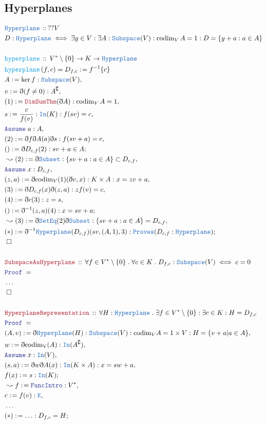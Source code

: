 \documentclass[12pt]{scrartcl}
\newcommand{\TYPE}[1]{\textcolor{NavyBlue}{\mathtt{#1}}}
\newcommand{\FUNC}[1]{\textcolor{Cerulean}{\mathtt{#1}}}
\newcommand{\LOGIC}[1]{\textcolor{Blue}{\mathtt{#1}}}
\newcommand{\THM}[1]{\textcolor{Maroon}{\mathtt{#1}}}
\renewcommand{\.}{\; . \;}
\newcommand{\de}{: \kern 0.1pc =}
\newcommand{\Act}[1]{\left( #1 \right)}
\newcommand{\Theorem}[2]{& \THM{#1} \, :: \, #2 \\ & \Proof = \\ }
\newcommand{\DeclareType}[2]{& \TYPE{#1} \, :: \, #2 \\}
\newcommand{\DefineType}[3]{& #1 : \TYPE{#2} \iff #3 \\}
\newcommand{\DeclareFunc}[2]{& \FUNC{#1} \, :: \, #2 \\}
\newcommand{\DefineNamedFunc}[4]{&  \FUNC{#1}\Act{#2} = #3 \de #4 \\}
\newcommand{\Page}[1]{\begin{align*} #1 \end{align*} \newpage   }
\newcommand{ \bd }{ \ByDef }
\newcommand{\NoProof}{ & \ldots \\ \EndProof}
\renewcommand{\c}{\complement}
\newcommand{\Say}[3]{& #1 \de #2 : #3, \\}
\newcommand{\Conclude}[3]{& #1 \de #2 : #3; \\}
\newcommand{\Derive}[3]{& \leadsto #1 \de #2 : #3, \\}
\newcommand{\A}{\LOGIC{Assume} \;}
\newcommand{\Assume}[2]{& \A #1 : #2, \\}
\newcommand{\QED}{\; \square}
\newcommand{\EndProof}{& \QED \\}
\newcommand{\ByDef}{\eth}
\newcommand{\Proof}{\LOGIC{Proof} \; }
\begin{document}
  \subsection{Hyperplanes}
  \Page{
   \DeclareType{Hyperplane}{??V}
   \DefineType{D}{Hyperplane}{\exists y \in V : \exists A : \TYPE{Subspace}(V) : 
    \mathrm{codim}_V \, A = 1 : D = \{  y + a : a \in A  \} }
   \\ 
   \DeclareFunc{hyperplane}{V^*\setminus \{ 0 \} \to K \to \TYPE{Hyperplane}  }
   \DefineNamedFunc{hyperplane}{f,c}{D_{f,c}}{ f^{-1}\{ c \} } 
   \Say{ A}{  \ker f }{ \TYPE{Subspace}(V) }
   \Say{ v  }{  \bd(f \neq 0)  }{ A^\c }
   \Say{ (1) }{ \THM{DimSumThm}(\bd A) }{ \mathrm{codim}_V \, A = 1}
   \Say{ s }{   \frac{c}{f(v)} }{ \TYPE{In}(K) : f(sv) = c} 
   \Assume{a}{A}
   \Say{(2)}{ \bd f \bd A(a) \bd s }{f(sv + a) = c}
   \Conclude{()}{\bd D_{c,f}(2)}{sv + a \in A}
   \Derive{ (2) }{\bd \TYPE{Subset}}{ \{  sv + a : a \in A  \} \subset D_{c,f} }
   \Assume{x}{ D_{c,f}}
   \Say{ (z,a)}{ \bd \mathrm{codim}_V (1)( \bd v, x) }{ K \times A : x = zv + a }
   \Say{(3)}{ \bd D_{c,f}(x) \bd(z,a)  }{ zf(v) = c  }
   \Say{(4)}{  \bd c (3) }{ z = s }
   \Conclude{()}{  \bd^{-1}(z,a)(4)  }{ x = sv + a }
   \Derive{(3)}{ \bd \TYPE{SetEq}(2) \bd \TYPE{Subset} }{ \{  sv + a : a \in A  \} = D_{c,f}}
   \Conclude{(*)}{ \bd^{-1}\TYPE{Hyperplane}(D_{c,f})(sv,(A,1),3) }{\TYPE{Proves}(
    D_{c,f} : \TYPE{Hyperplane}   
   )}  
   \EndProof
   \\    
   \Theorem{SubspaceAsHyperplane}{ \forall f \in V^* \setminus \{ 0 \} \. \forall c \in K \. 
     D_{f,c} : \TYPE{Subspace}(V) \iff c = 0   
    }
    \NoProof  
    \\
    \Theorem{HyperplaneRepresentation}{ \forall H : \TYPE{Hyperplane} \.
    \exists f  \in V^* \setminus \{ 0 \} : \exists c \in K : H = D_{f,c}     
    }
    \Say{(A,v)}{ \bd \TYPE{Hyperplane}(H) }{ 
    \TYPE{Subspace}(V) : \mathrm{codim}_V A = 1 \times V :     
    H  = \{ v + a | a \in A \}}
    \Say{w}{ \bd \mathrm{codim_V}(A) }{ \TYPE{In}(A^\c)}
    \Assume{x}{\TYPE{In}(V) }
    \Say{ (s,a)}{ \bd w \bd A (x) }{ \TYPE{In}(K \times A) : x = sw + a }
    \Conclude{f(x)}{s}{\TYPE{In}(K)}
    \Derive{f}{\LOGIC{FuncIntro}}{V^*}
    \Say{c}{f(v)}{\TYPE{K}}
    & \ldots \\
    \Conclude{(*)}{\ldots}{D_{f,c} = H}
  } 
\end{document}
